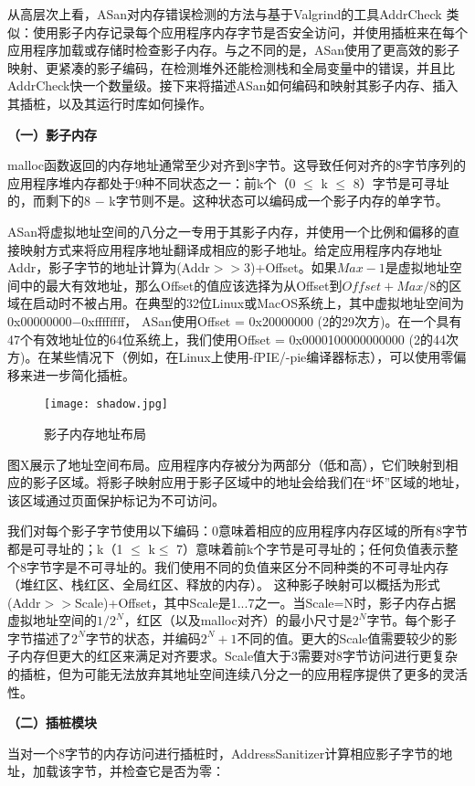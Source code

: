 从高层次上看，ASan对内存错误检测的方法与基于Valgrind的工具AddrCheck 类似：使用影子内存记录每个应用程序内存字节是否安全访问，并使用插桩来在每个应用程序加载或存储时检查影子内存。与之不同的是，ASan使用了更高效的影子映射、更紧凑的影子编码，在检测堆外还能检测栈和全局变量中的错误，并且比AddrCheck快一个数量级。接下来将描述ASan如何编码和映射其影子内存、插入其插桩，以及其运行时库如何操作。

\textbf{（一）影子内存}

malloc函数返回的内存地址通常至少对齐到8字节。这导致任何对齐的8字节序列的应用程序堆内存都处于9种不同状态之一：前k个（0 $\leq$ k $\leq$ 8）字节是可寻址的，而剩下的8 $-$ k字节则不是。这种状态可以编码成一个影子内存的单字节。

ASan将虚拟地址空间的八分之一专用于其影子内存，并使用一个比例和偏移的直接映射方式来将应用程序地址翻译成相应的影子地址。给定应用程序内存地址Addr，影子字节的地址计算为(Addr$>>$3)+Offset。如果$Max-1$是虚拟地址空间中的最大有效地址，那么Offset的值应该选择为从Offset到$Offset+Max/8$的区域在启动时不被占用。在典型的32位Linux或MacOS系统上，其中虚拟地址空间为0x00000000$-$0xffffffff，
ASan使用Offset = 0x20000000 (2的29次方)。在一个具有47个有效地址位的64位系统上，我们使用Offset = 0x0000100000000000 (2的44次方)。在某些情况下（例如，在Linux上使用-fPIE/-pie编译器标志），可以使用零偏移来进一步简化插桩。
\begin{figure}[ht]
	\centering
	\texttt{[image: shadow.jpg]}
	\caption{影子内存地址布局}
	\label{fig:shadow}
\end{figure}

图X展示了地址空间布局。应用程序内存被分为两部分（低和高），它们映射到相应的影子区域。将影子映射应用于影子区域中的地址会给我们在“坏”区域的地址，该区域通过页面保护标记为不可访问。

我们对每个影子字节使用以下编码：0意味着相应的应用程序内存区域的所有8字节都是可寻址的；k（1 $\leq$ k$\leq$ 7）意味着前k个字节是可寻址的；任何负值表示整个8字节字是不可寻址的。我们使用不同的负值来区分不同种类的不可寻址内存（堆红区、栈红区、全局红区、释放的内存）。
这种影子映射可以概括为形式(Addr$>>$Scale)+Offset，其中Scale是1...7之一。当Scale=N时，影子内存占据虚拟地址空间的$1/2^N$，红区（以及malloc对齐）的最小尺寸是$2^N$字节。每个影子字节描述了$2^N$字节的状态，并编码$2^N +1$不同的值。更大的Scale值需要较少的影子内存但更大的红区来满足对齐要求。Scale值大于3需要对8字节访问进行更复杂的插桩，但为可能无法放弃其地址空间连续八分之一的应用程序提供了更多的灵活性。

\textbf{（二）插桩模块}

当对一个8字节的内存访问进行插桩时，AddressSanitizer计算相应影子字节的地址，加载该字节，并检查它是否为零：


